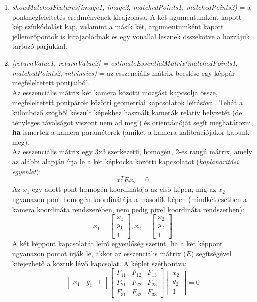 \documentclass[12pt]{report}
\begin{document}
\begin{enumerate}
                    \item \textit{showMatchedFeatures(image1, image2, matchedPoints1, matchedPoints2)} = a pontmegfeleltetés eredményének kirajzolása. A két agumentumként kapott kép színkódolást kap, valamint a másik két, argumentumként kapott jellemzőpontok is kirajzolódnak és egy vonallal lesznek összekötve a hozzájuk tartozó párjukkal.
                    \item \textit{[returnValue1, returnValue2] = estimateEssentialMatrix(matchedPoints1, matchedPoints2, intrinsics)} = az esszenciális mátrix becslése egy képpár megfeleltetett pontjaiból.\\
                    Az esszenciális mátrix két kamera közötti mozgást kapcsolja össze, megfeleltetett pontpárok közötti geometriai kapcsolatok leírásával. Tehát a különböző szögből készült képekhez használt kamerák relatív helyzetét (de tényleges távolságot viszont nem ad meg!) és orientációját segít meghatározni, \textbf{ha} ismertek a kamera paraméterek (amiket a kamera kalibrációjakor kapunk meg).\\
                    Az esszenciális mátrix egy 3x3 szerkezetű, homogén, 2-es rangú mátrix, amely az alábbi alapján írja le a két képkocka közötti kapcsolatot (\textit{koplanaritási egyenlet}):
                    \[x_1^TEx_2 = 0\]
                    Az $x_1$ egy adott pont homogén koordinátája az első képen, míg az $x_2$ ugyanazon pont homogén koordinátája a második képen (mindkét esetben a kamera koordináta rendszerében, nem pedig pixel koordináta rendszerben):
                    \[x_1 = \begin{bmatrix}x_1\\y_1\\1\end{bmatrix}, x_2 = \begin{bmatrix}x_2\\y_2\\1\end{bmatrix}\]
                    A két képpont kapcsolatát leíró egyenlőség szerint, ha a két képpont ugyanazon pontot írják le, akkor az esszenciális mátrix ($E$) segítségével kifejezhető a köztük lévő kapcsolat. A képlet szétbontva:\\
                    \[\begin{bmatrix}x_1&y_1&1\end{bmatrix}\begin{bmatrix}F_{11}&F_{12}&F_{13}\\F_{21}&F_{22}&F_{23}\\F_{31}&F_{32}&F_{33}\end{bmatrix}\begin{bmatrix}x_2\\y_2\\1\end{bmatrix} = 0\]

\end{enumerate}
\end{document}
